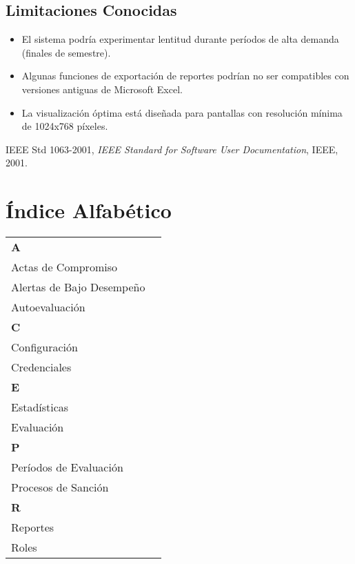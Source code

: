 \documentclass[12pt,a4paper]{article}
\begin{document}
\subsection{Limitaciones Conocidas}
\begin{itemize}
    \item El sistema podría experimentar lentitud durante períodos de alta demanda (finales de semestre).
    \item Algunas funciones de exportación de reportes podrían no ser compatibles con versiones antiguas de Microsoft Excel.
    \item La visualización óptima está diseñada para pantallas con resolución mínima de 1024x768 píxeles.
\end{itemize}

\clearpage
\begin{thebibliography}{1}
    IEEE Std 1063-2001, \textit{IEEE Standard for Software User Documentation}, IEEE, 2001.
\end{thebibliography}

\clearpage
\section*{Índice Alfabético}
\begin{tabularx}{\textwidth}{lX}
  \toprule
  \textbf{A} & \\
  Actas de Compromiso & \pageref{sec:glosario} \\
  Alertas de Bajo Desempeño & \pageref{sec:conceptos} \\
  Autoevaluación & \pageref{sec:procedimientos} \\
  \midrule
  \textbf{C} & \\
  Configuración & \pageref{sec:procedimientos} \\
  Credenciales & \pageref{sec:mensajes} \\
  \midrule
  \textbf{E} & \\
  Estadísticas & \pageref{sec:conceptos} \\
  Evaluación & \pageref{sec:introduccion} \\
  \midrule
  \textbf{P} & \\
  Períodos de Evaluación & \pageref{sec:procedimientos} \\
  Procesos de Sanción & \pageref{sec:procedimientos} \\
  \midrule
  \textbf{R} & \\
  Reportes & \pageref{sec:procedimientos} \\
  Roles & \pageref{sec:conceptos} \\
  \bottomrule
  
\end{tabularx}
\end{document}
